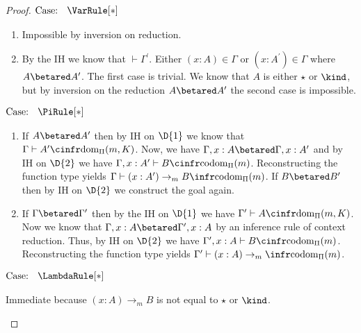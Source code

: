 \begin{proof}
$\text{Case: }\begin{array}{c} \VarRule[*] \end{array}$
\begin{proofcase}
    \begin{enumerate}
        \item Impossible by inversion on reduction.
        \item {
            By the IH we know that $\vdash \Gamma^\prime$.
            Either $(x : A) \in \Gamma$ or $(x : A^\prime) \in \Gamma$ where $A \betared A^\prime$.
            The first case is trivial.
            We know that $A$ is either $\star$ or $\kind$, but by inversion on the reduction $A \betared A^\prime$ the second case is impossible.        
        }
    \end{enumerate}
\end{proofcase}

$\text{Case: }\begin{array}{c} \PiRule[*] \end{array}$
\begin{proofcase}
    \begin{enumerate}
        \item {
            If $A \betared A^\prime$ then by IH on $\D{1}$ we know that $\Gamma \vdash A^\prime \cinfr \text{dom}_\Pi(m, K)$.
            Now, we have $\Gamma,x:A \betared \Gamma,x:A^\prime$ and by IH on $\D{2}$ we have $\Gamma,x:A^\prime \vdash B \cinfr \text{codom}_\Pi(m)$.
            Reconstructing the function type yields $\Gamma \vdash (x:A^\prime) \to_m B \infr \text{codom}_\Pi(m)$.
            If $B \betared B^\prime$ then by IH on $\D{2}$ we construct the goal again.
        }
        \item {
            If $\Gamma \betared \Gamma^\prime$ then by the IH on $\D{1}$ we have $\Gamma^\prime \vdash A \cinfr \text{dom}_\Pi(m, K)$.
            Now we know that $\Gamma,x:A \betared \Gamma^\prime, x:A$ by an inference rule of context reduction.
            Thus, by IH on $\D{2}$ we have $\Gamma^\prime, x:A \vdash B \cinfr \text{codom}_\Pi(m)$.
            Reconstructing the function type yields $\Gamma^\prime \vdash (x:A) \to_m \infr \text{codom}_\Pi(m)$.
        }
    \end{enumerate}
\end{proofcase}

$\text{Case: }\begin{array}{c} \LambdaRule[*] \end{array}$
\begin{proofcase}
    Immediate because $(x : A) \to_m B$ is not equal to $\star$ or $\kind$.
\end{proofcase}


\end{proof}
